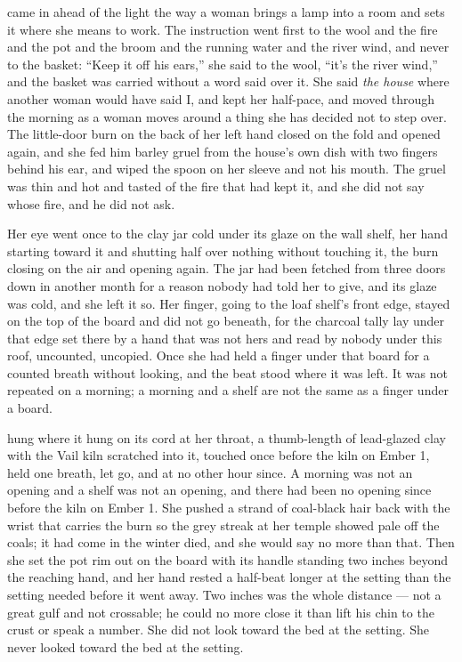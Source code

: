  came in ahead of the light the way a woman brings a lamp into a room and sets it where she means to work. The instruction went first to the wool and the fire and the pot and the broom and the running water and the river wind, and never to the basket: “Keep it off his ears,” she said to the wool, “it's the river wind,” and the basket was carried without a word said over it. She said \emph{the house} where another woman would have said I, and kept her half-pace, and moved through the morning as a woman moves around a thing she has decided not to step over. The little-door burn on the back of her left hand closed on the fold and opened again, and she fed him barley gruel from the house's own dish with two fingers behind his ear, and wiped the spoon on her sleeve and not his mouth. The gruel was thin and hot and tasted of the fire that had kept it, and she did not say whose fire, and he did not ask.

Her eye went once to the clay jar cold under its glaze on the wall shelf, her hand starting toward it and shutting half over nothing without touching it, the burn closing on the air and opening again. The jar had been fetched from three doors down in another month for a reason nobody had told her to give, and its glaze was cold, and she left it so. Her finger, going to the loaf shelf's front edge, stayed on the top of the board and did not go beneath, for the charcoal tally lay under that edge set there by a hand that was not hers and read by nobody under this roof, uncounted, uncopied. Once she had held a finger under that board for a counted breath without looking, and the beat stood where it was left. It was not repeated on a morning; a morning and a shelf are not the same as a finger under a board.

 hung where it hung on its cord at her throat, a thumb-length of lead-glazed clay with the Vail kiln scratched into it, touched once before the kiln on Ember 1, held one breath, let go, and at no other hour since. A morning was not an opening and a shelf was not an opening, and there had been no opening since before the kiln on Ember 1. She pushed a strand of coal-black hair back with the wrist that carries the burn so the grey streak at her temple showed pale off the coals; it had come in the winter  died, and she would say no more than that. Then she set the pot rim out on the board with its handle standing two inches beyond the reaching hand, and her hand rested a half-beat longer at the setting than the setting needed before it went away. Two inches was the whole distance --- not a great gulf and not crossable; he could no more close it than lift his chin to the crust or speak a number. She did not look toward the bed at the setting. She never looked toward the bed at the setting.


